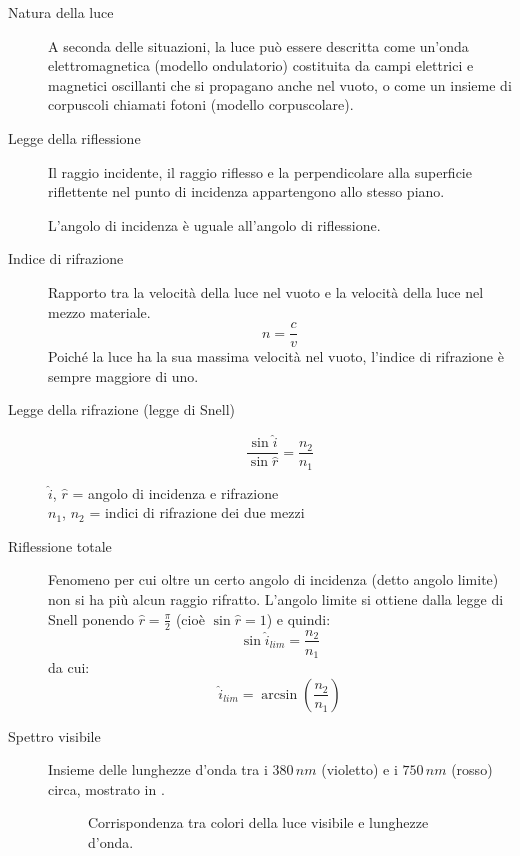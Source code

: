\documentclass[a4paper,11pt,italian]{article}
\begin{document}
\begin{description}
  \item[Natura della luce] 
  A seconda delle situazioni, la luce può essere descritta come un'onda elettromagnetica (modello ondulatorio) costituita da campi elettrici e magnetici oscillanti che si propagano anche nel vuoto, o come un insieme di corpuscoli chiamati fotoni (modello corpuscolare).
  
  \item[Legge della riflessione] 
  Il raggio incidente, il raggio riflesso e la perpendicolare alla superficie riflettente nel punto di incidenza appartengono allo stesso piano.
  
  L'angolo di incidenza è uguale all'angolo di riflessione.
  
  \item[Indice di rifrazione] 
  Rapporto tra la velocità della luce nel vuoto e la velocità della luce nel mezzo materiale.
  \[ n = \frac{c}{v} \]
  Poiché la luce ha la sua massima velocità nel vuoto, l'indice di rifrazione è sempre maggiore di uno.
  
  \item[Legge della rifrazione (legge di Snell)]
  \[ \frac{\sin \hat{i} }{\sin \hat{r}} = \frac{n_2}{n_1} \]
  \begin{multicols}{2}
  $ \hat{i} $, $ \hat{r} $ = angolo di incidenza e rifrazione\\
  $ n_1 $, $ n_2 $ = indici di rifrazione dei due mezzi
  \end{multicols}
  
  \item[Riflessione totale] 
  Fenomeno per cui oltre un certo angolo di incidenza (detto angolo limite) non si ha più alcun raggio rifratto. L'angolo limite si ottiene dalla legge di Snell ponendo $ \hat{r} = \frac{\pi}{2} $ (cioè $ \sin \hat{r} = 1 $) e quindi:
  \[ \sin \hat{i}_{lim} = \frac{n_2}{n_1} \]
  da cui:
  \[ \hat{i}_{lim} = \arcsin \left( \frac{n_2}{n_1} \right) \]
  
  \item[Spettro visibile] 
  Insieme delle lunghezze d'onda tra i $ 380 \, nm $ (violetto) e i $ 750 \, nm $ (rosso) circa, mostrato in .
  
  \begin{figure}[htb]\centering
    \pgfspectra[axis,axis step=30,end=750]
    \caption{Corrispondenza tra colori della luce visibile e lunghezze d'onda.}
    \label{img:spettrovisibile}
  \end{figure}
  

\end{description}
\end{document}
